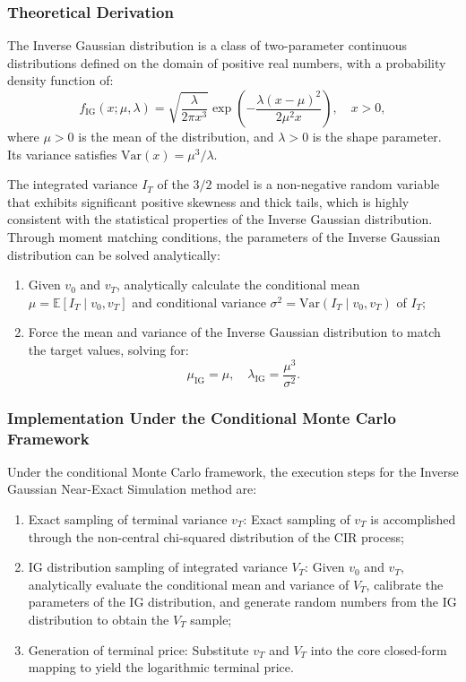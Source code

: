 \subsubsection{Theoretical Derivation}
The Inverse Gaussian distribution is a class of two-parameter continuous distributions defined on the domain of positive real numbers, with a probability density function of:
\begin{equation}
  f_{\text{IG}}(x; \mu, \lambda) = \sqrt{\frac{\lambda}{2\pi x^3}} \exp\left( -\frac{\lambda(x-\mu)^2}{2\mu^2 x} \right), \quad x > 0,
\end{equation}
where $\mu > 0$ is the mean of the distribution, and $\lambda > 0$ is the shape parameter. Its variance satisfies $\mathrm{Var}(x) = \mu^3/\lambda$.

The integrated variance $I_T$ of the $3/2$ model is a non-negative random variable that exhibits significant positive skewness and thick tails, which is highly consistent with the statistical properties of the Inverse Gaussian distribution. Through moment matching conditions, the parameters of the Inverse Gaussian distribution can be solved analytically:
\begin{enumerate}
    \item Given $v_0$ and $v_T$, analytically calculate the conditional mean $\mu = \mathbb{E}[I_T \mid v_0, v_T]$ and conditional variance $\sigma^2 = \mathrm{Var}(I_T \mid v_0, v_T)$ of $I_T$;
    
    \item Force the mean and variance of the Inverse Gaussian distribution to match the target values, solving for:
    \begin{equation}
        \mu_{\text{IG}} = \mu, \quad \lambda_{\text{IG}} = \frac{\mu^3}{\sigma^2}.
    \end{equation}
\end{enumerate}

\subsubsection{Implementation Under the Conditional Monte Carlo Framework}
Under the conditional Monte Carlo framework, the execution steps for the Inverse Gaussian Near-Exact Simulation method are:
\begin{enumerate}
    \item Exact sampling of terminal variance $v_T$: Exact sampling of $v_T$ is accomplished through the non-central chi-squared distribution of the CIR process;
    \item IG distribution sampling of integrated variance $V_T$: Given $v_0$ and $v_T$, analytically evaluate the conditional mean and variance of $V_T$, calibrate the parameters of the IG distribution, and generate random numbers from the IG distribution to obtain the $V_T$ sample;
    \item Generation of terminal price: Substitute $v_T$ and $V_T$ into the core closed-form mapping to yield the logarithmic terminal price.
\end{enumerate}

